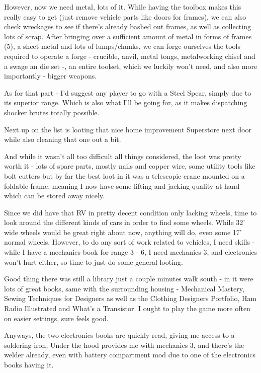 However, now we need metal, lots of it. While having the toolbox makes this really easy to get (just remove vehicle parts like doors for frames), we can also check wreckages to see if there's already bashed out frames, as well as collecting lots of scrap. After bringing over a sufficient amount of metal in forms of frames (5), a sheet metal and lots of lumps/chunks, we can forge ourselves the tools required to operate a forge - crucible, anvil, metal tongs, metalworking chisel and a swage an die set -, an entire toolset, which we luckily won't need, and also more importantly - bigger weapons.

As for that part - I'd suggest any player to go with a Steel Spear, simply due to its superior range. Which is also what I'll be going for, as it makes dispatching shocker brutes totally possible.

Next up on the list is looting that nice home improvement Superstore next door while also cleaning that one out a bit.

And while it wasn't all too difficult all things considered, the loot was pretty worth it - lots of spare parts, mostly nails and copper wire, some utility tools like bolt cutters but by far the best loot in it was a telescopic crane mounted on a foldable frame, meaning I now have some lifting and jacking quality at hand which can be stored away nicely.

Since we did have that RV in pretty decent condition only lacking wheels, time to look around the different kinds of cars in order to find some wheels. While 32' wide wheels would be great right about now, anything will do, even some 17' normal wheels. However, to do any sort of work related to vehicles, I need skills - while I have a mechanics book for range 3 - 6, I need mechanics 3, and electronics won't hurt either, so time to just do some general looting.

Good thing there was still a library just a couple minutes walk south - in it were lots of great books, same with the surrounding housing - Mechanical Mastery, Sewing Techniques for Designers as well as the Clothing Designers Portfolio, Ham Radio Illustrated and What's a Transistor. I ought to play the game more often on easier settings, sure feels good.

Anyways, the two electronics books are quickly read, giving me access to a soldering iron, Under the hood provides me with mechanics 3, and there's the welder already, even with battery compartment mod due to one of the electronics books having it.

